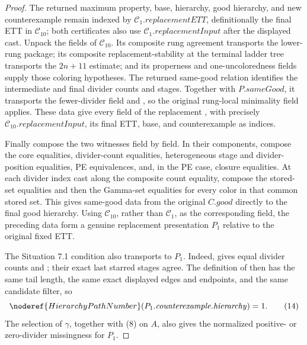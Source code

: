 \begin{proof}
The returned maximum property, base, hierarchy, good hierarchy, and new
counterexample remain indexed by
\(\mathcal C_1.\mathit{replacementETT}\), definitionally the final ETT
in \(\mathcal C_{10}\); both certificates also use
\(\mathcal C_1.\mathit{replacementInput}\) after the displayed cast.
Unpack the fields of \(\mathcal C_{10}\).  Its composite rung agreement
transports the lower-rung package; its composite replacement-stability at
the terminal ladder tree transports the \(2n+11\) estimate; and its
properness and one-uncoloredness fields supply those coloring hypotheses.
The returned same-good relation identifies the intermediate and final
divider counts and stages.  Together with \(P.\mathit{sameGood}\), it
transports the fewer-divider field and
, so the original rung-local
minimality field applies.  These data give every field of the replacement
, with precisely
\(\mathcal C_{10}.\mathit{replacementInput}\), its final ETT, base, and
counterexample as indices.

Finally compose the two  witnesses field by
field.  In their  components, compose the
core equalities, divider-count equalities, heterogeneous stage and
divider-position equalities, PE equivalences, and, in the PE case,
closure equalities.  At each divider index cast along the composite count
equality, compose the stored-set equalities and then the Gamma-set
equalities for every color in that common stored set.  This gives
same-good data from the original \(C.\mathit{good}\) directly to the
final good hierarchy.  Using \(\mathcal C_{10}\), rather than
\(\mathcal C_1\), as the corresponding field, the preceding data form a
genuine replacement presentation \(P_1\) relative to the original fixed
ETT.

The Situation 7.1 condition also transports to \(P_1\).  Indeed,
 gives equal divider counts and
; their exact last starred stages agree.
The definition of  then has the same tail
length, the same exact displayed edges and endpoints, and the same
candidate filter, so
\[
 \noderef{HierarchyPathNumber}
       (P_1.\mathit{counterexample}.\mathit{hierarchy})=1.    \tag{14}
\]
The selection of \(\gamma\), together with (8) on \(A\), also gives the
normalized positive- or zero-divider missingness for \(P_1\).


\end{proof}
